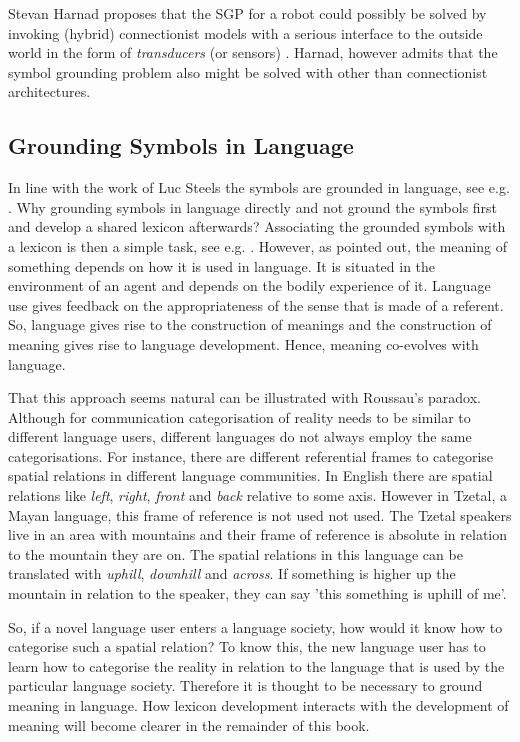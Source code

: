  Stevan Harnad proposes that the SGP for a robot could possibly be solved by invoking (hybrid) connectionist models with a serious interface to the outside world in the form of {\em transducers} (or sensors) \citep{harnad:1993}. Harnad, however admits that the symbol grounding problem also might be solved with other than connectionist architectures.

\subsection{Grounding Symbols in Language}

In line with the work of Luc Steels the symbols are grounded in language, see e.g. \citep{steels:1997a,steels:2000}. Why grounding symbols in language directly and not ground the symbols first and develop a shared lexicon afterwards? Associating the grounded symbols with a lexicon is then a simple task, see e.g. \citep{oliphant:1997,steels:1996a}. However, as \citet{wittgenstein:1958} pointed out, the meaning of something depends on how it is used in language. It is situated in the environment of an agent and depends on the bodily experience of it. Language use gives feedback on the appropriateness of the sense that is made of a referent. So, language gives rise to the construction of meanings and the construction of meaning gives rise to language development. Hence, meaning co-evolves with language.

That this approach seems natural can be illustrated with Roussau's paradox. Although for communication categorisation of reality needs to be similar to different language users, different languages do not always employ the same categorisations. For instance, there are different referential frames to categorise spatial relations in different language communities. In English there are spatial relations like {\em left}, {\em right}, {\em front} and {\em back} relative to some axis. However in Tzetal, a Mayan language, this frame of reference is not used not used. The Tzetal speakers live in an area with mountains and their frame of reference is absolute in relation to the mountain they are on. The spatial relations in this language can be translated with {\em uphill}, {\em downhill} and {\em across}. If something is higher up the mountain in relation to the speaker, they can say 'this something is uphill of me'.

So, if a novel language user enters a language society, how would it know how to categorise such a spatial relation? To know this, the new language user has to learn how to categorise the reality in relation to the language that is used by the particular language society. Therefore it is thought to be necessary to ground meaning in language. How lexicon development interacts with the development of meaning will become clearer in the remainder of this book.


